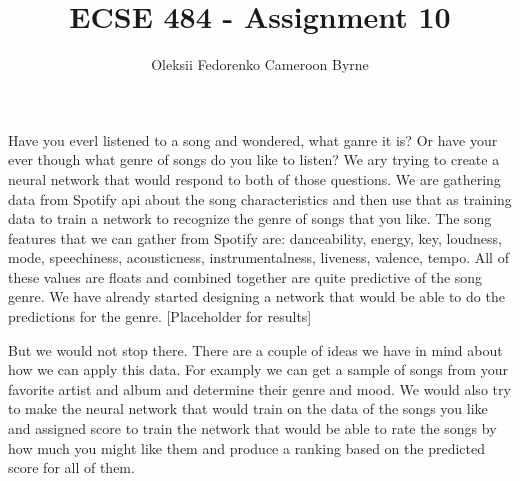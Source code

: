 \documentclass[12pt, oneside, a4paper]{article}
\begin{document}
 
    \title{\textbf{ECSE 484 - Assignment 10}}
    \author{Oleksii Fedorenko \newline Cameroon Byrne}
    \maketitle
    
    Have you everl listened to a song and wondered, what ganre it is? Or have your ever though what genre of songs do you like to listen? We ary trying to create a neural network that would respond to both of those questions. We are gathering data from Spotify api about the song characteristics and then use that as training data to train a network to recognize the genre of songs that you like. The song features that we can gather from Spotify are: danceability, energy, key, loudness, mode, speechiness, acousticness, instrumentalness, liveness, valence, tempo. All of these values are floats and combined together are quite predictive of the song genre. We have already started designing a network that would be able to do the predictions for the genre. [Placeholder for results]

    But we would not stop there. There are a couple of ideas we have in mind about how we can apply this data. For examply we can get a sample of songs from your favorite artist and album and determine their genre and mood. We would also try to make the neural network that would train on the data of the songs you like and assigned score to train the network that would be able to rate the songs by how much you might like them and produce a ranking based on the predicted score for all of them. 
\end{document}
